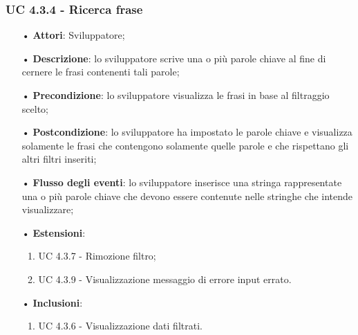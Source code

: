 \subsubsection{UC 4.3.4 - Ricerca frase}
\begin{itemize}
	\item[•]\textbf{Attori}: Sviluppatore;
	\item[•]\textbf{Descrizione}: lo sviluppatore scrive una o più parole chiave al fine di cernere le frasi contenenti tali parole;
	\item[•]\textbf{Precondizione}: lo sviluppatore visualizza le frasi in base al filtraggio scelto;
	\item[•]\textbf{Postcondizione}: lo sviluppatore ha impostato le parole chiave e visualizza solamente le frasi che contengono solamente quelle parole e che rispettano gli altri filtri inseriti;
	\item[•]\textbf{Flusso degli eventi}: lo sviluppatore inserisce una stringa rappresentate una o più parole chiave che devono essere contenute nelle stringhe che intende visualizzare;
	\item[•]\textbf{Estensioni}: 
	\begin{enumerate}
		\item UC 4.3.7 - Rimozione filtro;
		\item UC 4.3.9 - Visualizzazione messaggio di errore input errato.
	\end{enumerate}
	\item[•]\textbf{Inclusioni}:
	\begin{enumerate}
		\item UC 4.3.6 - Visualizzazione dati filtrati.
	\end{enumerate}
\end{itemize}

